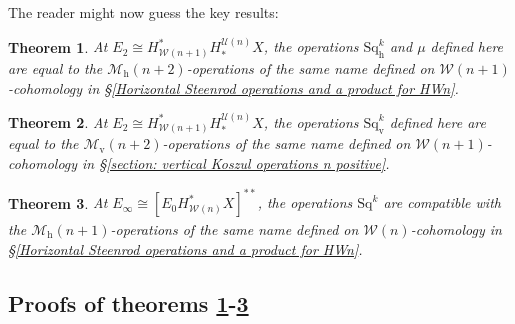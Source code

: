 \documentclass[11pt]{amsart} \renewcommand{\baselinestretch}{1.2}
\theoremstyle{plain}
\newtheorem{thm}{Theorem}[section]
\theoremstyle{definition}
\newcommand{\calU}{\mathcal{U}}
\newcommand{\calw}{\mathcal{W}}
\newcommand{\calMv}{\mathcal{M}\dver}
\newcommand{\calMh}{\mathcal{M}\dhor}
\newcommand{\Sq}{\mathrm{Sq}}
\newcommand{\Edown}[4]{[E_{#1}#2]^{#3}_{#4}}
\newcommand{\dver}{_\mathrm{v}}
\newcommand{\dhor}{_\mathrm{h}}
\newcommand{\Sqh}{\mathrm{Sq}\dhor}
\newcommand{\Sqv}{\mathrm{Sq}\dver}
\begin{document}
\begin{Operations in composite functor spectral sequences}
The reader might now guess the key results:
\begin{thm}
\label{E2CompFuncLieOperationsID}
At $E_2\cong H^*_{\calw(n+1)}H_*^{\calU(n)}X$, the operations $\Sqh^k$ and $\mu$ defined here are equal to the $\calMh(n+2)$-operations of the same name defined on $\calw(n+1)$-cohomology in
\S\ref{Horizontal Steenrod operations and a product for HWn}.
\end{thm}
\begin{thm}
\label{E2CompFuncKosOperationsID}
At $E_2\cong H^*_{\calw(n+1)}H_*^{\calU(n)}X$, the operations $\Sqv^k$ defined here are equal to the $\calMv(n+2)$-operations of the same name defined on $\calw(n+1)$-cohomology in
\S\ref{section: vertical Koszul operations n positive}.
\end{thm}
\begin{thm}
\label{EInftyCompFuncOperationsID}
At $E_\infty \cong \Edown{0}{H^*_{\calw(n)}X}{**}{}$, the operations $\Sq^k$ are compatible with the
$\calMh(n+1)$-operations of the same name defined on $\calw(n)$-cohomology in
\S\ref{Horizontal Steenrod operations and a product for HWn}.
%
\end{thm} 
\subsection{Proofs of theorems \ref{E2CompFuncLieOperationsID}-\ref{EInftyCompFuncOperationsID}}


\end{Operations in composite functor spectral sequences}
\end{document}
